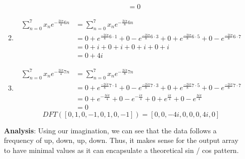 \documentclass{article}
\begin{document}
\begin{enumerate}[label=\Alph*)]
\begin{enumerate}[label={k=\arabic*}, start=0]
\begin{align*}
                                                                           & = 0
                        \end{align*}
                  \item \begin{align*}
                              \sum_{n=0}^{7}{x_n e^{-\frac{2 i \pi}{4}6n}} & = \sum_{n=0}^{7}{x_n e^{-\frac{2 i \pi}{8}6n}}                                                                                                              \\
                                                                           & = 0 + e^{\frac{-2 i \pi}{8} 6 \cdot 1} + 0 - e^{\frac{-2 i \pi}{8} 6 \cdot 3} + 0 + e^{\frac{-2 i \pi}{8} 6 \cdot 5} + 0 - e^{\frac{-2 i \pi}{8} 6 \cdot 7} \\
                                                                           & = 0 + i + 0 + i + 0 + i + 0 + i                                                                                                                             \\
                                                                           & = 0 + 4i
                        \end{align*}
                  \item \begin{align*}
                              \sum_{n=0}^{7}{x_n e^{-\frac{2 i \pi}{4}7n}} & = \sum_{n=0}^{7}{x_n e^{-\frac{2 i \pi}{8}7n}}                                                                                                              \\
                                                                           & = 0 + e^{\frac{-2 i \pi}{8} 7 \cdot 1} + 0 - e^{\frac{-2 i \pi}{8} 7 \cdot 3} + 0 + e^{\frac{-2 i \pi}{8} 7 \cdot 5} + 0 - e^{\frac{-2 i \pi}{8} 7 \cdot 7} \\
                                                                           & = 0 + e^{-\frac{3 i \pi}{4}} + 0 - e^{-\frac{i \pi}{4}} + 0 + e^{\frac{i \pi}{4}} + 0 - e^{\frac{3 i \pi}{4}}                                               \\
                                                                           & = 0
                        \end{align*}
                        \begin{equation*}
                              DFT([0, 1, 0, -1, 0, 1, 0, -1]) = [0, 0, -4i, 0, 0, 0, 4i, 0]
                        \end{equation*}
            \end{enumerate}
            \textbf{Analysis}: Using our imagination, we can see that the data follows a frequency of up, down, up, down. Thus, it makes sense for the output array to have minimal values as it can encapsulate a theoretical sin / cos pattern.
\end{enumerate}
\end{document}
